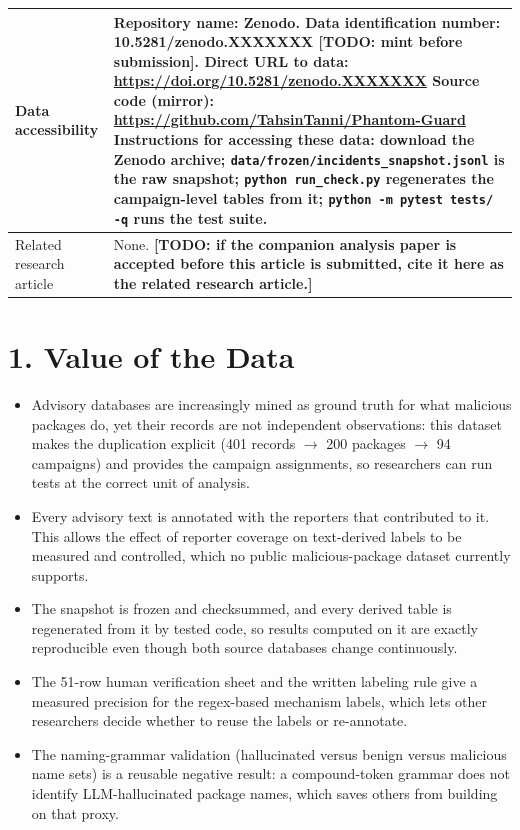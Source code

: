 \documentclass[preprint,12pt]{elsarticle}
\begin{document}
\begin{longtable}{>{\raggedright\arraybackslash}p{} >{\raggedright\arraybackslash}p{}}
\midrule
Data accessibility & Repository name: Zenodo. \newline
Data identification number: 10.5281/zenodo.XXXXXXX \textbf{[TODO: mint before submission]}. \newline
Direct URL to data: \url{https://doi.org/10.5281/zenodo.XXXXXXX} \newline
Source code (mirror): \url{https://github.com/TahsinTanni/Phantom-Guard} \newline
Instructions for accessing these data: download the Zenodo archive; \texttt{data/frozen/incidents\_snapshot.jsonl} is the raw snapshot; \texttt{python run\_check.py} regenerates the campaign-level tables from it; \texttt{python -m pytest tests/ -q} runs the test suite. \\
\midrule
Related research article & None. \textbf{[TODO: if the companion analysis paper is accepted before this article is submitted, cite it here as the related research article.]} \\
\bottomrule
\end{longtable}

\section*{1. Value of the Data}

\begin{itemize}
\item Advisory databases are increasingly mined as ground truth for what malicious packages do, yet their records are not independent observations: this dataset makes the duplication explicit (401 records $\rightarrow$ 200 packages $\rightarrow$ 94 campaigns) and provides the campaign assignments, so researchers can run tests at the correct unit of analysis.
\item Every advisory text is annotated with the reporters that contributed to it. This allows the effect of reporter coverage on text-derived labels to be measured and controlled, which no public malicious-package dataset currently supports.
\item The snapshot is frozen and checksummed, and every derived table is regenerated from it by tested code, so results computed on it are exactly reproducible even though both source databases change continuously.
\item The 51-row human verification sheet and the written labeling rule give a measured precision for the regex-based mechanism labels, which lets other researchers decide whether to reuse the labels or re-annotate.
\item The naming-grammar validation (hallucinated versus benign versus malicious name sets) is a reusable negative result: a compound-token grammar does not identify LLM-hallucinated package names, which saves others from building on that proxy.
\end{itemize}
\end{document}
